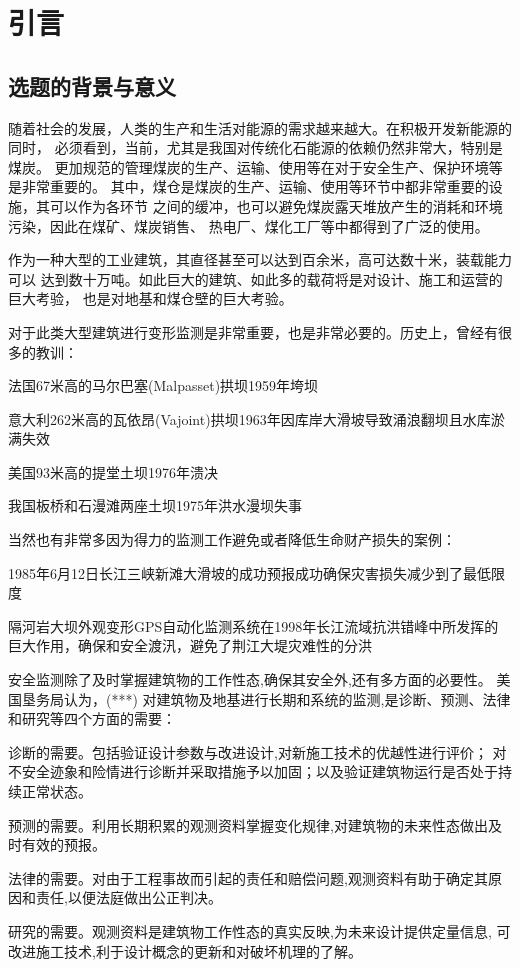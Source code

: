 
\chapter{引言}
\label{chap00}

\section{选题的背景与意义}
随着社会的发展，人类的生产和生活对能源的需求越来越大。在积极开发新能源的同时，
必须看到，当前，尤其是我国对传统化石能源的依赖仍然非常大，特别是煤炭。
更加规范的管理煤炭的生产、运输、使用等在对于安全生产、保护环境等是非常重要的。
其中，煤仓是煤炭的生产、运输、使用等环节中都非常重要的设施，其可以作为各环节
之间的缓冲，也可以避免煤炭露天堆放产生的消耗和环境污染，因此在煤矿、煤炭销售、
热电厂、煤化工厂等中都得到了广泛的使用。

作为一种大型的工业建筑，其直径甚至可以达到百余米，高可达数十米，装载能力可以
达到数十万吨。如此巨大的建筑、如此多的载荷将是对设计、施工和运营的巨大考验，
也是对地基和煤仓壁的巨大考验。

对于此类大型建筑进行变形监测是非常重要，也是非常必要的。历史上，曾经有很多的教训：
\begin{asparaitem}[$\bullet$]
\item 法国67米高的马尔巴塞(Malpasset)拱坝1959年垮坝
\item 意大利262米高的瓦依昂(Vajoint)拱坝1963年因库岸大滑坡导致涌浪翻坝且水库淤满失效
\item 美国93米高的提堂土坝1976年溃决
\item 我国板桥和石漫滩两座土坝1975年洪水漫坝失事
\end{asparaitem}
当然也有非常多因为得力的监测工作避免或者降低生命财产损失的案例：
\begin{asparaitem}[$\bullet$]
\item 1985年6月12日长江三峡新滩大滑坡的成功预报成功确保灾害损失减少到了最低限度
\item 隔河岩大坝外观变形GPS自动化监测系统在1998年长江流域抗洪错峰中所发挥的巨大作用，确保和安全渡汛，避免了荆江大堤灾难性的分洪
\end{asparaitem}

安全监测除了及时掌握建筑物的工作性态,确保其安全外,还有多方面的必要性。
美国垦务局认为，(***)
对建筑物及地基进行长期和系统的监测,是诊断、预测、法律和研究等四个方面的需要：
\begin{asparaitem}[$\bullet$]
\item 诊断的需要。包括验证设计参数与改进设计,对新施工技术的优越性进行评价；
对不安全迹象和险情进行诊断并采取措施予以加固；以及验证建筑物运行是否处于持续正常状态。
\item 预测的需要。利用长期积累的观测资料掌握变化规律,对建筑物的未来性态做出及时有效的预报。
\item 法律的需要。对由于工程事故而引起的责任和赔偿问题,观测资料有助于确定其原因和责任,以便法庭做出公正判决。
\item 研究的需要。观测资料是建筑物工作性态的真实反映,为未来设计提供定量信息,
可改进施工技术,利于设计概念的更新和对破坏机理的了解。
\end{asparaitem}

